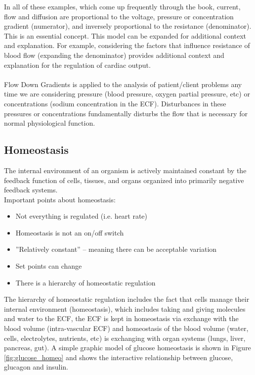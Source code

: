 In all of these examples, which come up frequently through the book, current, flow and diffusion are proportional to the voltage, pressure or concentration gradient (numerator), and inversely proportional to the resistance (denominator). This is an essential concept. This model can be expanded for additional context and explanation. For example, considering the factors that influence resistance of blood flow (expanding the denominator) provides additional context and explanation for the regulation of cardiac output. 

\paragraph{}
Flow Down Gradients is applied to the analysis of patient/client problems any time we are considering pressure (blood pressure, oxygen partial pressure, etc) or concentrations (sodium concentration in the ECF). Disturbances in these pressures or concentrations fundamentally disturbs the flow that is necessary for normal physiological function.

\subsection{Homeostasis}
The internal environment of an organism is actively maintained constant by the feedback function of cells, tissues, and organs organized into primarily negative feedback systems.\\
Important points about homeostasis:
\begin{itemize}
    \item Not everything is regulated (i.e. heart rate)
    \item Homeostasis is not an on/off switch
    \item ”Relatively constant” – meaning there can be acceptable variation
    \item Set points can change
    \item There is a hierarchy of homeostatic regulation
\end{itemize}

The hierarchy of homeostatic regulation includes the fact that cells manage their internal environment (homeostasis), which includes taking and giving molecules and water to the ECF, the ECF is kept in homeostasis via exchange  with the blood volume (intra-vascular ECF) and homeostasis of the blood volume (water, cells, electrolytes, nutrients, etc) is exchanging with organ systems (lungs, liver, pancreas, gut). A simple graphic model of glucose homeostasis is shown in Figure \ref{fig:glucose_homeo} and shows the interactive relationship between glucose, glucagon and insulin.

